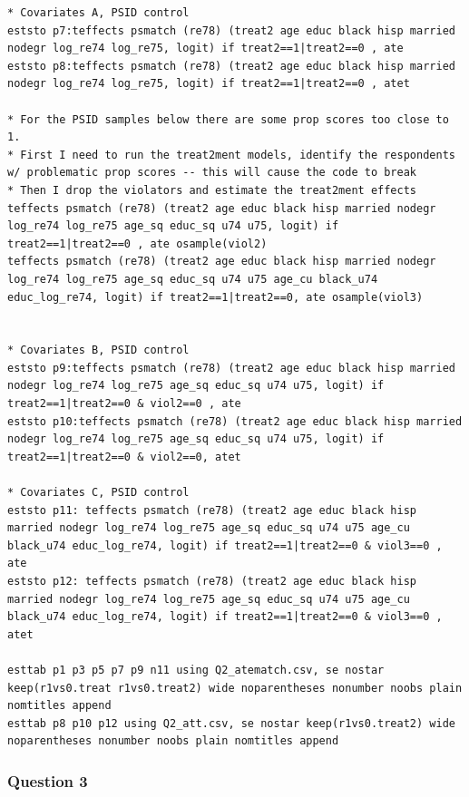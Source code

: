 \documentclass[12pt]{article}
\begin{document}
\begin{verbatim}
* Covariates A, PSID control
eststo p7:teffects psmatch (re78) (treat2 age educ black hisp married nodegr log_re74 log_re75, logit) if treat2==1|treat2==0 , ate 
eststo p8:teffects psmatch (re78) (treat2 age educ black hisp married nodegr log_re74 log_re75, logit) if treat2==1|treat2==0 , atet 

* For the PSID samples below there are some prop scores too close to 1.
* First I need to run the treat2ment models, identify the respondents w/ problematic prop scores -- this will cause the code to break
* Then I drop the violators and estimate the treat2ment effects
teffects psmatch (re78) (treat2 age educ black hisp married nodegr log_re74 log_re75 age_sq educ_sq u74 u75, logit) if treat2==1|treat2==0 , ate osample(viol2) 
teffects psmatch (re78) (treat2 age educ black hisp married nodegr log_re74 log_re75 age_sq educ_sq u74 u75 age_cu black_u74 educ_log_re74, logit) if treat2==1|treat2==0, ate osample(viol3)


* Covariates B, PSID control
eststo p9:teffects psmatch (re78) (treat2 age educ black hisp married nodegr log_re74 log_re75 age_sq educ_sq u74 u75, logit) if treat2==1|treat2==0 & viol2==0 , ate
eststo p10:teffects psmatch (re78) (treat2 age educ black hisp married nodegr log_re74 log_re75 age_sq educ_sq u74 u75, logit) if treat2==1|treat2==0 & viol2==0, atet 

* Covariates C, PSID control
eststo p11: teffects psmatch (re78) (treat2 age educ black hisp married nodegr log_re74 log_re75 age_sq educ_sq u74 u75 age_cu black_u74 educ_log_re74, logit) if treat2==1|treat2==0 & viol3==0 , ate 
eststo p12: teffects psmatch (re78) (treat2 age educ black hisp married nodegr log_re74 log_re75 age_sq educ_sq u74 u75 age_cu black_u74 educ_log_re74, logit) if treat2==1|treat2==0 & viol3==0 , atet 

esttab p1 p3 p5 p7 p9 n11 using Q2_atematch.csv, se nostar keep(r1vs0.treat r1vs0.treat2) wide noparentheses nonumber noobs plain nomtitles append
esttab p8 p10 p12 using Q2_att.csv, se nostar keep(r1vs0.treat2) wide noparentheses nonumber noobs plain nomtitles append

\end{verbatim}


\subsubsection{Question 3}
\end{document}
